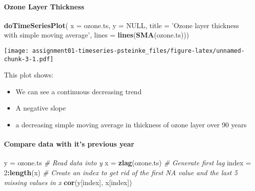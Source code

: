 \documentclass[]{article}
\newenvironment{Shaded}{\begin{snugshade}}{\end{snugshade}}
\newcommand{\CommentTok}[1]{\textcolor[rgb]{0.56,0.35,0.01}{\textit{#1}}}
\newcommand{\DataTypeTok}[1]{\textcolor[rgb]{0.13,0.29,0.53}{#1}}
\newcommand{\DecValTok}[1]{\textcolor[rgb]{0.00,0.00,0.81}{#1}}
\newcommand{\KeywordTok}[1]{\textcolor[rgb]{0.13,0.29,0.53}{\textbf{#1}}}
\newcommand{\NormalTok}[1]{#1}
\newcommand{\OperatorTok}[1]{\textcolor[rgb]{0.81,0.36,0.00}{\textbf{#1}}}
\newcommand{\OtherTok}[1]{\textcolor[rgb]{0.56,0.35,0.01}{#1}}
\newcommand{\StringTok}[1]{\textcolor[rgb]{0.31,0.60,0.02}{#1}}
\providecommand{\tightlist}{%
  \setlength{\itemsep}{0pt}\setlength{\parskip}{0pt}}
\let\oldparagraph\paragraph
\renewcommand{\paragraph}[1]{\oldparagraph{#1}\mbox{}}
\begin{document}
\hypertarget{ozone-layer-thickness}{%
\paragraph{Ozone Layer Thickness}\label{ozone-layer-thickness}}

\begin{Shaded}
\begin{Highlighting}[]
\KeywordTok{doTimeSeriesPlot}\NormalTok{(}
  \DataTypeTok{x =}\NormalTok{ ozone.ts,}
  \DataTypeTok{y =} \OtherTok{NULL}\NormalTok{,}
  \DataTypeTok{title =} \StringTok{'Ozone layer thickness with simple moving average'}\NormalTok{,}
  \DataTypeTok{lines =} \KeywordTok{lines}\NormalTok{(}\KeywordTok{SMA}\NormalTok{(ozone.ts)))}
\end{Highlighting}
\end{Shaded}

\texttt{[image: assignment01-timeseries-psteinke\_files/figure-latex/unnamed-chunk-3-1.pdf]}

This plot shows:

\begin{itemize}
\tightlist
\item
  We can see a continuous decreasing trend
\item
  A negative slope
\item
  a decreasing simple moving average in thickness of ozone layer over 90
  years
\end{itemize}

\hypertarget{compare-data-with-its-previous-year}{%
\paragraph{Compare data with it's previous
year}\label{compare-data-with-its-previous-year}}

\begin{Shaded}
\begin{Highlighting}[]
\NormalTok{y =}\StringTok{ }\NormalTok{ozone.ts              }\CommentTok{# Read data into y}
\NormalTok{x =}\StringTok{ }\KeywordTok{zlag}\NormalTok{(ozone.ts)        }\CommentTok{# Generate first lag }
\NormalTok{index =}\StringTok{ }\DecValTok{2}\OperatorTok{:}\KeywordTok{length}\NormalTok{(x)          }\CommentTok{# Create an index to get rid of the first NA value and the last 5 missing values in x}
\KeywordTok{cor}\NormalTok{(y[index], x[index])}
\end{Highlighting}
\end{Shaded}
\end{document}
